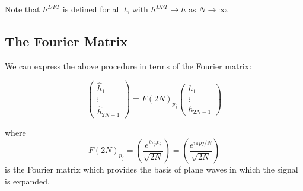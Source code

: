 \documentclass{physics_notes}
\begin{document}
Note that $h^{DFT}$ is defined for all $t$, with $h^{DFT} \to h$ as $N\to\infty$.

\subsection{The Fourier Matrix}

We can express the above procedure in terms of the Fourier matrix:

\begin{equation*}
\begin{pmatrix} \hat{h}_1 \\ \vdots \\ \hat{h}_{2N-1} \end{pmatrix} = F(2N)_{p_j} \begin{pmatrix} h_1 \\ \vdots \\ h_{2N-1} \end{pmatrix}
\end{equation*}

where
\begin{equation}
F(2N)_{p_j} = \left(\frac{e^{i\omega_p t_j}}{\sqrt{2N}}\right) = \left(\frac{e^{i\pi p j/N}}{\sqrt{2N}}\right)
\end{equation}
is the Fourier matrix which provides the basis of plane waves in which the signal is expanded.
\end{document}
